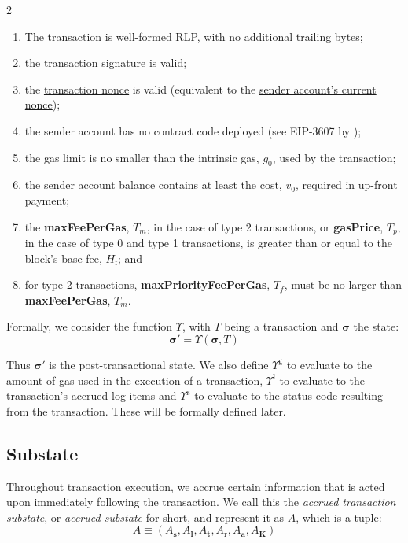 \documentclass[9pt,oneside]{amsart}
\begin{document}
\begin{multicols}{2}
\begin{enumerate}
\item The transaction is well-formed RLP, with no additional trailing bytes;
\item the transaction signature is valid;
\item the \hyperlink{transaction_nonce}{transaction nonce} is valid (equivalent to the \hyperlink{account_nonce}{sender account's current nonce});
\item the sender account has no contract code deployed (see EIP-3607 by \cite{EIP-3607});
\item the gas limit is no smaller than the intrinsic gas, $g_0$, used by the transaction;
\item the sender account balance contains at least the cost, $v_0$, required in up-front payment;
\item the \textbf{maxFeePerGas}, $T_m$, in the case of type 2 transactions, or \textbf{gasPrice}, $T_p$, in the case of type 0 and type 1 transactions, is greater than or equal to the block's base fee, $H_{\mathrm{f}}$; and
\item for type 2 transactions, \textbf{maxPriorityFeePerGas}, $T_f$, must be no larger than \textbf{maxFeePerGas}, $T_m$.
\end{enumerate}

Formally, we consider the function \hyperlink{Upsilon_state_transition}{$\Upsilon$}, with $T$ being a transaction and $\boldsymbol{\sigma}$ the state:
\begin{equation}
\boldsymbol{\sigma}' = \Upsilon(\boldsymbol{\sigma}, T)
\end{equation}

Thus $\boldsymbol{\sigma}'$ is the post-transactional state. We also define \hyperlink{tx_total_gas_used_Upsilon_pow_g}{$\Upsilon^{\mathrm{g}}$} to evaluate to the amount of gas used in the execution of a transaction, \hyperlink{tx_logs_Upsilon_pow_l}{$\Upsilon^{\mathbf{l}}$} to evaluate to the transaction's accrued log items and \hyperlink{tx_status_Upsilon_pow_z}{$\Upsilon^{\mathrm{z}}$} to evaluate to the status code resulting from the transaction. These will be formally defined later.

\subsection{Substate} \label{ch:substate}
Throughout transaction execution, we accrue certain information that is acted upon immediately following the transaction. We call this the \textit{accrued transaction substate}, or \textit{accrued substate} for short, and represent it as $A$, which is a tuple:
\begin{equation}
A \equiv (A_{\mathbf{s}}, A_{\mathbf{l}}, A_{\mathbf{t}}, A_{\mathrm{r}}, A_{\mathbf{a}}, A_{\mathbf{K}})
\end{equation}


\end{multicols}
\end{document}
